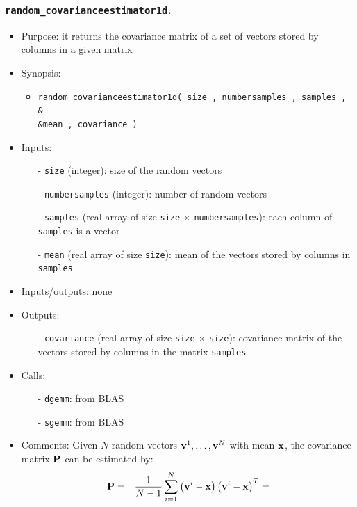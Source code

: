 \documentclass[12pt]{article}
\begin{document}
\subsubsection{{\tt random\_covarianceestimator1d}.}
\begin{itemize}
\item Purpose: it returns the covariance matrix of a set of vectors stored by columns in a given matrix
\item Synopsis: 
\begin{itemize}
\item {\tt random\_covarianceestimator1d( size , numbersamples , samples , \& \\ \&mean , covariance )}
\end{itemize}
\item Inputs: 
\begin{itemize}
\item[-] {\tt size} (integer): size of the random vectors
\item[-] {\tt numbersamples} (integer): number of random vectors
\item[-] {\tt samples} (real array of size {\tt size} $\times$ {\tt numbersamples}): each column of {\tt samples} is a vector
\item[-] {\tt mean} (real array of size {\tt size}): mean of the vectors stored by columns in {\tt samples}
\end{itemize}
\item Inputs/outputs: none
\item Outputs:
\begin{itemize}
\item[-] {\tt covariance} (real array of size {\tt size} $\times$ {\tt size}): covariance matrix of the vectors stored by columns in the matrix {\tt samples}
\end{itemize}
\item Calls: 
\begin{itemize}
\item[-] {\tt dgemm}: from BLAS
\item[-] {\tt sgemm}: from BLAS
\end{itemize}
\item Comments: Given $N$ random vectors ${\bf v}^1, \ldots, {\bf v}^N$ with mean ${\bf x}$, the covariance matrix ${\bf P}$ can be estimated by:
\begin{eqnarray} \label{randomcovarianceestimator1d}
{\bf P} & = & \frac{1}{N-1} \sum_{i=1}^{N} \left( {\bf v}^i - {\bf x} \right) \left( {\bf v}^i - {\bf x} \right)^T = \nonumber
\\

\end{eqnarray}
\end{itemize}
\end{document}
